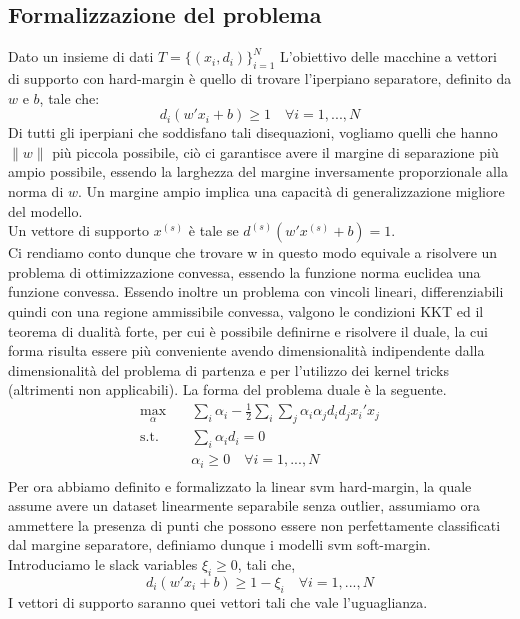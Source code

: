 \documentclass[12pt]{extarticle}
\begin{document}
\subsection{Formalizzazione del problema}
Dato un insieme di dati $T = \{(x_i, d_i)\}_{i=1}^N$ L'obiettivo delle macchine a vettori di supporto con hard-margin è quello di trovare l'iperpiano separatore, definito da $w$ e $b$, tale che:
\[d_i(w'x_i + b) \geq 1 \quad \forall i = 1, ..., N\]
Di tutti gli iperpiani che soddisfano tali disequazioni, vogliamo quelli che hanno $\| w \|$ più piccola possibile, ciò ci garantisce avere il margine di separazione più ampio possibile, essendo la larghezza del margine inversamente proporzionale alla norma di $w$. Un margine ampio implica una capacità di generalizzazione migliore del modello.\\
Un vettore di supporto $x^{(s)}$ è tale se $d^{(s)}(w'x^{(s)} +b) = 1$.\\
Ci rendiamo conto dunque che trovare w in questo modo equivale a risolvere un problema di ottimizzazione convessa, essendo la funzione norma euclidea una funzione convessa. Essendo inoltre un problema con vincoli lineari, differenziabili quindi con una regione ammissibile convessa, valgono le condizioni KKT ed il teorema di dualità forte, per cui è possibile definirne e risolvere il duale, la cui forma risulta essere più conveniente avendo dimensionalità indipendente dalla dimensionalità del problema di partenza e  per l'utilizzo dei kernel tricks (altrimenti non applicabili). La forma del problema duale è la seguente.
\begin{equation}
\begin{aligned}
\max_{\alpha} \quad & \sum_i \alpha_i - \frac{1}{2}\sum_i \sum_j \alpha_i \alpha_j d_i d_j x_i'x_j\\
\textrm{s.t.} \quad & \sum_i \alpha_i d_i = 0\\
  & \alpha_i \geq 0 \quad \forall i = 1, ..., N\\
\end{aligned}
\end{equation}
Per ora abbiamo definito e formalizzato la linear svm hard-margin, la quale assume avere un dataset linearmente separabile senza outlier, assumiamo ora ammettere la presenza di punti che possono essere non perfettamente classificati dal margine separatore, definiamo dunque i modelli svm soft-margin.\\
Introduciamo le slack variables $\xi_i \geq 0$, tali che,
\[d_i(w'x_i + b) \geq 1 - \xi_i \quad \forall i = 1, ..., N\]
I vettori di supporto saranno quei vettori tali che vale l'uguaglianza.\\
\end{document}
